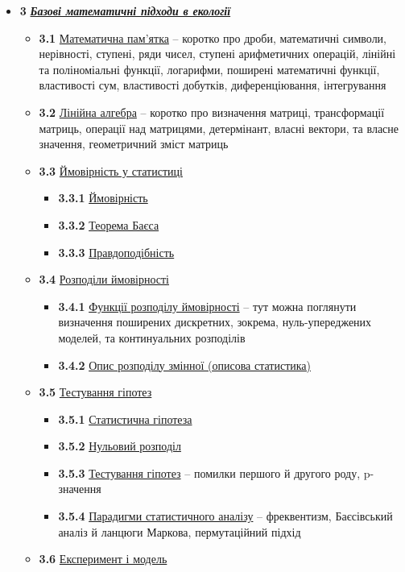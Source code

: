 \documentclass[
  11pt,
]{book}
\begin{document}
\begin{itemize}
\item
  \textbf{3} \hyperref[numerical-ecology]{\textbf{\emph{Базові математичні підходи в екології}}}

  \begin{itemize}
  \item
    \textbf{3.1} \hyperref[algebra]{Математична пам'ятка} -- коротко про дроби, математичні символи, нерівності, ступені, ряди чисел, ступені арифметичних операцій, лінійні та поліноміальні функції, логарифми, поширені математичні функції, властивості сум, властивості добутків, диференціювання, інтегрування
  \item
    \textbf{3.2} \hyperref[matrices]{Лінійна алгебра} -- коротко про визначення матриці, трансформації матриць, операції над матрицями, детермінант, власні вектори, та власне значення, геометричний зміст матриць
  \item
    \textbf{3.3} \hyperref[stats]{Ймовірність у статистиці}

    \begin{itemize}
    \item
      \textbf{3.3.1} \hyperref[prob]{Ймовірність}
    \item
      \textbf{3.3.2} \hyperref[bayes]{Теорема Баєса}
    \item
      \textbf{3.3.3} \hyperref[mle]{Правдоподібність}
    \end{itemize}
  \item
    \textbf{3.4} \hyperref[pdf-pmf]{Розподіли ймовірності}

    \begin{itemize}
    \item
      \textbf{3.4.1} \hyperref[pdfs]{Функції розподілу ймовірності} -- тут можна поглянути визначення поширених дискретних, зокрема, нуль-упереджених моделей, та континуальних розподілів
    \item
      \textbf{3.4.2} \hyperref[bars]{Опис розподілу змінної (описова статистика)}
    \end{itemize}
  \item
    \textbf{3.5} \hyperref[basic-hypotheses]{Тестування гіпотез}

    \begin{itemize}
    \item
      \textbf{3.5.1} \hyperref[hypothesis]{Статистична гіпотеза}
    \item
      \textbf{3.5.2} \hyperref[nulldistr]{Нульовий розподіл}
    \item
      \textbf{3.5.3} \hyperref[pval]{Тестування гіпотез} -- помилки першого й другого роду, p-значення
    \item
      \textbf{3.5.4} \hyperref[paradigms]{Парадигми статистичного аналізу} -- фреквентизм, Баєсівський аналіз й ланцюги Маркова, пермутаційний підхід
    \end{itemize}
  \item
    \textbf{3.6} \hyperref[stat-models]{Експеримент і модель}


\end{itemize}
\end{itemize}
\end{document}
